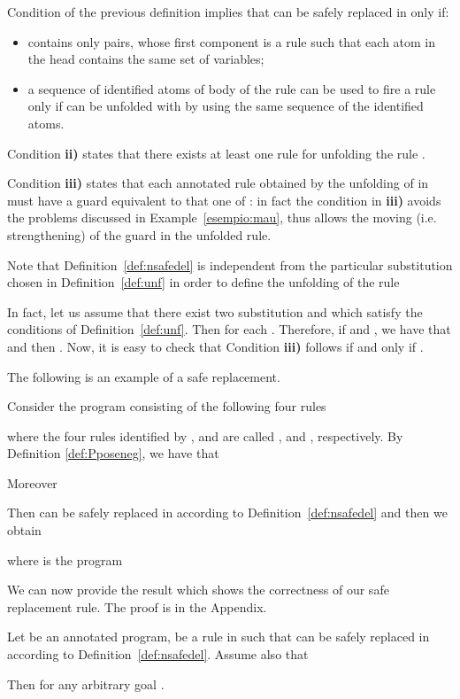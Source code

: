 \documentclass{tlp}
\begin{document}
Condition  of the previous definition implies that
 can be
safely replaced in  only if:
\begin{itemize}
\item  contains only pairs, whose 
first component is a rule such that each atom in the head contains the same set of variables;

\item  a sequence of identified atoms of
body of the rule  can be used to fire a rule 
only if  can be unfolded with   by using the same sequence
of the identified atoms.
\end{itemize}

Condition {\bf ii)} states that there exists at least one rule for unfolding
the rule .

Condition {\bf iii)}  states that each annotated rule obtained by the
unfolding of  in  must have a guard equivalent to that one of : in fact
the condition   in {\bf iii)} avoids the
problems discussed in Example~\ref{esempio:mau}, thus allows the moving (i.e. strengthening)
of the guard in the unfolded rule.

Note that Definition~\ref{def:nsafedel} is independent from the particular substitution  chosen in Definition~\ref{def:unf} in order to define the unfolding of the rule

In fact, let us assume that there exist two substitution  and  which satisfy the conditions of Definition~\ref{def:unf}.
Then  for each .
Therefore, if  and
, we have that  and then
.
Now, it is easy to check that Condition {\bf iii)} follows if and only if .


The following is an example of a safe replacement.
\begin{example}\label{ex:safe1}
Consider the program  consisting of the following four rules

where the four rules identified by , and  are called , and , respectively.
By Definition \ref{def:Pposeneg}, we have that


Moreover


Then   can be safely replaced in  according to Definition~\ref{def:nsafedel} and then we obtain

where  is the program

\end{example}


We can now provide the result which shows the correctness of our safe replacement rule. The proof is in the Appendix.

\begin{theorem}\label{theo:n1completeness}
Let  be an annotated program,   be a rule in  such that
 can be safely replaced
in  according to Definition~\ref{def:nsafedel}. Assume also that


Then  for any arbitrary
goal .
\end{theorem}
\end{document}
